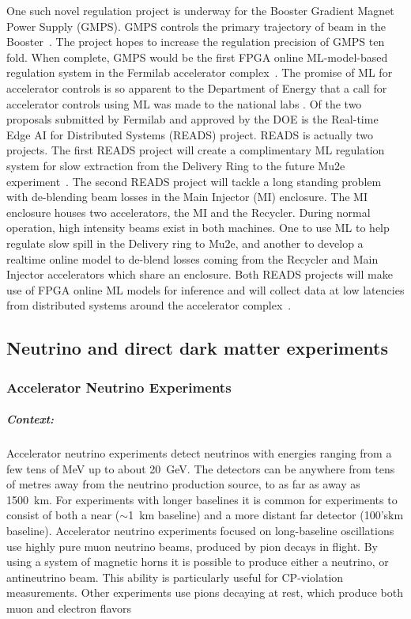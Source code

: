             One such novel regulation project is underway for the Booster Gradient Magnet Power Supply (GMPS). GMPS controls the primary trajectory of beam in the Booster~\cite{operations_booster_rookie_book}. 
            The project hopes to increase the regulation precision of GMPS ten fold. 
            When complete, GMPS would be the first FPGA online ML-model-based regulation system in the Fermilab accelerator complex~\cite{john2021realtime}. 
            The promise of ML for accelerator controls is so apparent to the Department of Energy that a call for accelerator controls using ML was made to the national labs \cite{doe_foa_lab_20-2261}. Of the two proposals submitted by Fermilab and approved by the DOE is the Real-time Edge AI for Distributed Systems (READS) project. READS is actually two projects. 
            The first READS project will create a complimentary ML regulation system for slow extraction from the Delivery Ring to the future Mu2e experiment~\cite{bartoszek2015mu2e}. 
            The second READS project will tackle a long standing problem with de-blending beam losses in the Main Injector (MI) enclosure. The MI enclosure houses two accelerators, the MI and the Recycler. 
            During normal operation, high intensity beams exist in both machines. 
            One to use ML to help regulate slow spill in the Delivery ring to Mu2e, and another to develop a realtime online model to de-blend losses coming from the Recycler and Main Injector accelerators which share an enclosure. Both READS projects will make use of FPGA online ML models for inference and will collect data at low latencies from distributed systems around the accelerator complex~\cite{seiya2021accelerator}.

\subsection{Neutrino and direct dark matter experiments}
\subsubsection{Accelerator Neutrino Experiments}\label{sec:nuaccel}

\subparagraph*{Context:} Accelerator neutrino experiments detect neutrinos with energies ranging from a few tens of MeV up to about 20~GeV. The detectors can be anywhere from tens of metres away from the neutrino production source, to as far as away as 1500~km. For experiments with longer baselines it is common for experiments to consist of both a near ($\sim$1~km baseline) and a more distant far detector (100's\unit{km} baseline). 
Accelerator neutrino experiments focused on long-baseline oscillations use highly pure muon neutrino beams, produced by pion decays in flight. By using a system of magnetic horns it is possible to produce either a neutrino, or antineutrino beam. This ability is particularly useful for CP-violation measurements.   Other experiments use pions decaying at rest, which produce both muon and electron flavors
    
